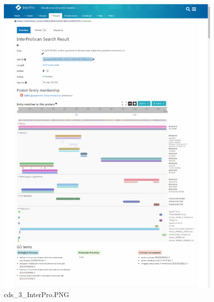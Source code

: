 \documentclass[supercite]{HustGraduPaper}
\begin{document}
	\begin{figure}[H]
		\centering
		\includegraphics[width=1\textwidth]{./material/practice2/cds_3/InterPro.png}
		\caption{cds\_3\_InterPro.PNG}
	\end{figure}
\end{document}
